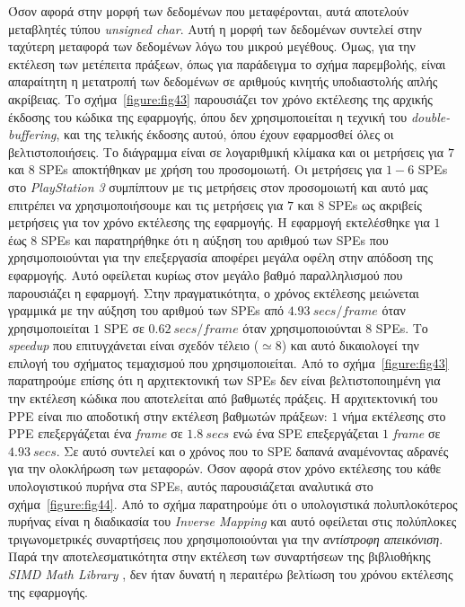 Όσον αφορά στην μορφή των δεδομένων που μεταφέρονται, αυτά αποτελούν μεταβλητές τύπου \textsl{unsigned char}. Αυτή η μορφή των δεδομένων συντελεί στην ταχύτερη μεταφορά των δεδομένων λόγω του μικρού μεγέθους. Όμως, για την εκτέλεση των μετέπειτα πράξεων, όπως για παράδειγμα το σχήμα παρεμβολής, είναι απαραίτητη η μετατροπή των δεδομένων σε αριθμούς κινητής υποδιαστολής απλής ακρίβειας.\newline
\indent
Το σχήμα~\ref{figure:fig43} παρουσιάζει τον χρόνο εκτέλεσης της αρχικής έκδοσης του κώδικα της εφαρμογής, όπου δεν χρησιμοποιείται η τεχνική του \textsl{double-buffering}, και της τελικής έκδοσης αυτού, όπου έχουν εφαρμοσθεί όλες οι βελτιστοποιήσεις. Το διάγραμμα είναι σε λογαριθμική κλίμακα και οι μετρήσεις για \(7\) και \(8\) \acp{SPE} αποκτήθηκαν με χρήση του προσομοιωτή. Οι μετρήσεις για \(1-6\) \acp{SPE} στο \textsl{PlayStation 3} συμπίπτουν με τις μετρήσεις στον προσομοιωτή και αυτό μας επιτρέπει να χρησιμοποιήσουμε και τις μετρήσεις για \(7\) και \(8\) \acp{SPE} ως ακριβείς μετρήσεις για τον χρόνο εκτέλεσης της εφαρμογής.\newline \indent 
Η εφαρμογή εκτελέσθηκε για \(1\) έως \(8\) \acp{SPE} και παρατηρήθηκε ότι η αύξηση του αριθμού των \acp{SPE} που χρησιμοποιούνται για την επεξεργασία αποφέρει μεγάλα οφέλη στην απόδοση της εφαρμογής. Αυτό οφείλεται κυρίως στον μεγάλο βαθμό παραλληλισμού που παρουσιάζει η εφαρμογή. Στην πραγματικότητα, ο χρόνος εκτέλεσης μειώνεται γραμμικά με την αύξηση του αριθμού των \acp{SPE} από \(4.93\ secs/frame\) όταν χρησιμοποιείται \(1\) \ac{SPE} σε \(0.62\ secs/frame\) όταν χρησιμοποιούνται \(8\) \acp{SPE}. Το \textsl{speedup} που επιτυγχάνεται είναι σχεδόν τέλειο (\(\simeq 8\)) και αυτό δικαιολογεί την επιλογή του σχήματος τεμαχισμού που χρησιμοποιείται. Από το σχήμα~\ref{figure:fig43} παρατηρούμε επίσης ότι η αρχιτεκτονική των \acp{SPE} δεν είναι βελτιστοποιημένη για την εκτέλεση κώδικα που αποτελείται από βαθμωτές πράξεις. Η αρχιτεκτονική του \ac{PPE} είναι πιο αποδοτική στην εκτέλεση βαθμωτών πράξεων: \(1\) νήμα εκτέλεσης στο \ac{PPE} επεξεργάζεται ένα \textsl{frame} σε \(1.8\ secs\) ενώ ένα \ac{SPE} επεξεργάζεται \(1\) \textsl{frame} σε \(4.93\ secs\). Σε αυτό συντελεί και ο χρόνος που το \ac{SPE} δαπανά αναμένοντας αδρανές για την ολοκλήρωση των μεταφορών.\newline \indent
Όσον αφορά στον χρόνο εκτέλεσης του κάθε υπολογιστικού πυρήνα στα \acp{SPE}, αυτός παρουσιάζεται αναλυτικά στο σχήμα~\ref{figure:fig44}. Από το σχήμα παρατηρούμε ότι ο υπολογιστικά πολυπλοκότερος πυρήνας είναι η διαδικασία του \textsl{Inverse Mapping} και αυτό οφείλεται στις πολύπλοκες τριγωνομετρικές συναρτήσεις που χρησιμοποιούνται για την \textsl{αντίστροφη απεικόνιση}. Παρά την αποτελεσματικότητα στην εκτέλεση των συναρτήσεων της βιβλιοθήκης \textsl{SIMD Math Library} \cite{simdmath}, δεν ήταν δυνατή η περαιτέρω βελτίωση του χρόνου εκτέλεσης της εφαρμογής.
